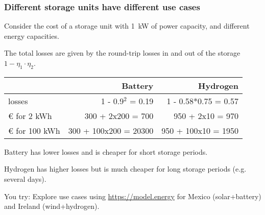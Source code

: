 \documentclass[10pt,aspectratio=169,dvipsnames]{beamer}
\newcommand{\ra}[1]{\renewcommand{\arraystretch}{#1}}
\begin{document}
\begin{frame}
  \frametitle{Different storage units have different use cases}

  Consider the cost of a storage unit with 1~kW of power capacity, and different energy capacities.

  The total losses are given by the \alert{round-trip losses} in and
  out of the storage $1- \eta_1\cdot \eta_2$.

  \ra{1.05}
  \begin{table}[!t]
    \begin{tabular}{lrr}
      \toprule
      & Battery & Hydrogen \\
      \midrule
      losses & 1 - 0.9$^2$ = 0.19 & 1 - 0.58*0.75 = 0.57 \\
      \euro{} for 2 kWh & 300 + 2x200 = 700 & 950 + 2x10 = 970 \\
      \euro{} for 100 kWh & 300 + 100x200 = 20300 & 950 + 100x10 = 1950 \\
      \bottomrule
    \end{tabular}
  \end{table}

  Battery has lower losses and is cheaper for short storage periods.

  Hydrogen has higher losses but is much cheaper for long storage periods (e.g. several days).


  \alert{You try}: Explore use cases using \url{https://model.energy} for Mexico (solar+battery) and Ireland (wind+hydrogen).
\end{frame}
\end{document}
